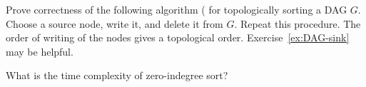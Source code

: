 \begin{Exercise}
\label{ex:zero-indeg}
Prove correctness of the following algorithm ( for topologically sorting a DAG $G$. Choose a source node, write it, and delete it from $G$. Repeat this procedure. The order of writing of the nodes gives a topological order. Exercise~\ref{ex:DAG-sink} may be helpful.

\end{Exercise}


\begin{Exercise}
\label{ex:zero-indeg-runtime}

What is the time complexity of zero-indegree sort? 
\end{Exercise}